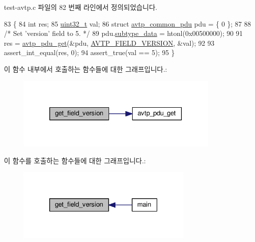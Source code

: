 test-\/avtp.\+c 파일의 82 번째 라인에서 정의되었습니다.


\begin{DoxyCode}
83 \{
84     \textcolor{keywordtype}{int} res;
85     \hyperlink{parse_8c_a6eb1e68cc391dd753bc8ce896dbb8315}{uint32\_t} val;
86     \textcolor{keyword}{struct }\hyperlink{structavtp__common__pdu}{avtp\_common\_pdu} pdu = \{ 0 \};
87 
88     \textcolor{comment}{/* Set 'version' field to 5. */}
89     pdu.\hyperlink{structavtp__common__pdu_a3210e9f18fdc9c29cef7600c4d1e67e9}{subtype\_data} = htonl(0x00500000);
90 
91     res = \hyperlink{avtp_8h_a5834d6469319080f4b98b71db402a672}{avtp\_pdu\_get}(&pdu, \hyperlink{avtp_8h_ae8ac82f40d36ba8c7a71a451a1d7ddf0a7e7c49ba84d0ff1d6f92707dd34cd364}{AVTP\_FIELD\_VERSION}, &val);
92 
93     assert\_int\_equal(res, 0);
94     assert\_true(val == 5);
95 \}
\end{DoxyCode}


이 함수 내부에서 호출하는 함수들에 대한 그래프입니다.\+:
\nopagebreak
\begin{figure}[H]
\begin{center}
\leavevmode
\includegraphics[width=281pt]{test-avtp_8c_a8582c25f1ffa15fe206e6940d8f7c206_cgraph}
\end{center}
\end{figure}




이 함수를 호출하는 함수들에 대한 그래프입니다.\+:
\nopagebreak
\begin{figure}[H]
\begin{center}
\leavevmode
\includegraphics[width=244pt]{test-avtp_8c_a8582c25f1ffa15fe206e6940d8f7c206_icgraph}
\end{center}
\end{figure}


